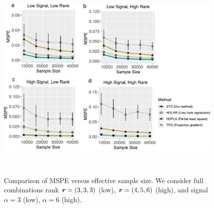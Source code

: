 \documentclass[12pt]{article}
\theoremstyle{definition}
\theoremstyle{definition}
\begin{document}
\begin{figure}[H]
\centering
\includegraphics[width=15cm]{Supp_Figure2.pdf} 
\caption{Comparison of MSPE versus effective sample size. We consider full combinations rank $\bm{r}=(3,3,3)$ (low), $\bm{r}=(4,5,6)$ (high), and signal $\alpha=3$ (low), $\alpha=6$ (high). }~\label{fig:S2}
\end{figure}

\newpage


\end{document}
